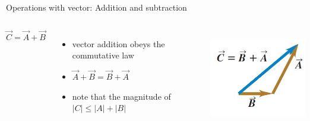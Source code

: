 \documentclass[]{beamer}
\begin{document}
    \begin{frame}

      Operations with vector: Addition and subtraction
      
      \vspace{3 mm}
      
      
      
         \begin{columns}[c]
         \column{2in}  %
      
      
      \begin{equation*}
      \vec{C}=\vec{A}+\vec{B}
      \end{equation*}
      
      \begin{itemize}
      \item vector addition obeys the commutative law
      
      \item $\vec{A}+\vec{B}=\vec{B}+\vec{A}$
      
      \item  note that the magnitude of $\lvert C \rvert \leq\lvert A \rvert+\lvert B \rvert$
      \end{itemize}
      
        
         \column{2in}
      
      
      
      
        \begin{center}
        \includegraphics[height=1.7in]{images/vectorsum2.jpg}
      \end{center}
      
      
         \end{columns}
      
      
      \end{frame}



\end{document}
